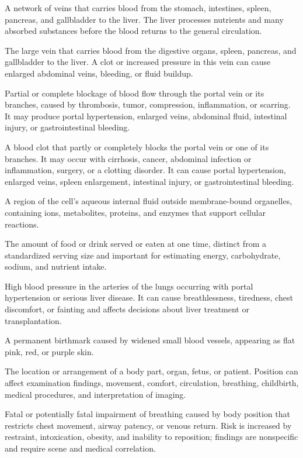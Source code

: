  A network of veins that carries blood from the stomach, intestines, spleen, pancreas, and gallbladder to the liver. The liver processes nutrients and many absorbed substances before the blood returns to the general circulation.

 The large vein that carries blood from the digestive organs, spleen, pancreas, and gallbladder to the liver. A clot or increased pressure in this vein can cause enlarged abdominal veins, bleeding, or fluid buildup.

 Partial or complete blockage of blood flow through the portal vein or its branches, caused by thrombosis, tumor, compression, inflammation, or scarring. It may produce portal hypertension, enlarged veins, abdominal fluid, intestinal injury, or gastrointestinal bleeding.

 A blood clot that partly or completely blocks the portal vein or one of its branches. It may occur with cirrhosis, cancer, abdominal infection or inflammation, surgery, or a clotting disorder. It can cause portal hypertension, enlarged veins, spleen enlargement, intestinal injury, or gastrointestinal bleeding.

 A region of the cell’s aqueous internal fluid outside membrane-bound organelles, containing ions, metabolites, proteins, and enzymes that support cellular reactions.

 The amount of food or drink served or eaten at one time, distinct from a standardized serving size and important for estimating energy, carbohydrate, sodium, and nutrient intake.

 High blood pressure in the arteries of the lungs occurring with portal hypertension or serious liver disease. It can cause breathlessness, tiredness, chest discomfort, or fainting and affects decisions about liver treatment or transplantation.

 A permanent birthmark caused by widened small blood vessels, appearing as flat pink, red, or purple skin.

 The location or arrangement of a body part, organ, fetus, or patient. Position can affect examination findings, movement, comfort, circulation, breathing, childbirth, medical procedures, and interpretation of imaging.

 Fatal or potentially fatal impairment of breathing caused by body position that
restricts chest movement, airway patency, or venous return. Risk is increased by
restraint, intoxication, obesity, and inability to reposition; findings are nonspecific
and require scene and medical correlation.

